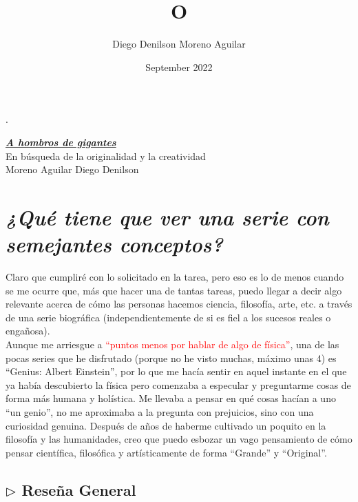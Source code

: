 \documentclass{article}
\title{O}
\author{Diego Denilson Moreno Aguilar}
\date{September 2022}
\begin{document}
\pagecolor{Black}
\color{White}
\pagestyle{fancy}
\fancyhf{}
\thispagestyle{plain}
\textcolor{Black}{.}
\vspace{2cm}
\begin{center}

    \huge{\textbf{\textit{\underline{A hombros de gigantes}}}}\\
    \vspace{12pt}
    \Large{En búsqueda de la originalidad y la creatividad}\\
    \vspace{10pt}
    Moreno Aguilar Diego Denilson
    \vspace{20pt}
    
\end{center}

\section*{\emph{¿Qué tiene que ver una serie con semejantes conceptos?}}

Claro que cumpliré con lo solicitado en la tarea, pero eso es lo de menos cuando se me ocurre que, más que hacer una de tantas tareas, puedo llegar a decir algo relevante acerca de cómo las personas hacemos ciencia, filosofía, arte, etc. a través de una serie biográfica (independientemente de si es fiel a los sucesos reales o engañosa).\\

Aunque me arriesgue a \textcolor{red}{``puntos menos por hablar de algo de física''}, una de las pocas series que he disfrutado (porque no he visto muchas, máximo unas 4) es ``Genius: Albert Einstein'', por lo que me hacía sentir en aquel instante en el que ya había descubierto la física pero comenzaba a especular y preguntarme cosas de forma más humana y holística. Me llevaba a pensar en qué cosas hacían a uno ``un genio'', no me aproximaba a la pregunta con prejuicios, sino con una curiosidad genuina. Después de años de haberme cultivado un poquito en la filosofía y las humanidades, creo que puedo esbozar un vago pensamiento de cómo pensar científica, filosófica y artísticamente de forma ``Grande'' y ``Original''.

\subsection*{$\triangleright$ Reseña General}
\end{document}
